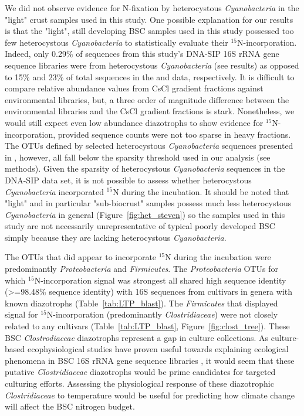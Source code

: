We did not observe evidence for N-fixation by heterocystous
\textit{Cyanobacteria} in the "light" crust samples used in this study. One
possible explanation for our results is that the "light", still developing
BSC samples used in this study possessed too few heterocystous
\textit{Cyanobacteria} to statistically evaluate their $^{15}$N-incorporation.
Indeed, only 0.29\% of sequences from this study's DNA-SIP 16S rRNA gene
sequence libraries were from heterocystous \textit{Cyanobacteria} (see results)
as opposed to 15\% and 23\% of total sequences in the \citet{Steven_2013} and
\citet{Garcia_Pichel_2013} data, respectively. It is difficult to compare
relative abundance values from CsCl gradient fractions against environmental
libraries, but, a three order of magnitude difference between the
environmental libraries and the CsCl gradient fractions is stark.
Nonetheless, we would still expect even low abundance diazotrophs to show
evidence for $^{15}$N-incorporation, provided sequence counts were not too
sparse in heavy fractions. The OTUs defined by selected heterocystous
\textit{Cyanobacteria} sequences presented in \citet{Yeager}, however, all
fall below the sparsity threshold used in our analysis (see methods). Given the
sparsity of heterocystous \textit{Cyanobacteria} sequences in the DNA-SIP data
set, it is not possible
to assess whether heterocystous \textit{Cyanobacteria} incorporated $^{15}$N
during the incubation. It should be noted that "light" and in particular
"sub-biocrust" samples possess much less heterocystous \textit{Cyanobacteria}
in general (Figure~\ref{fig:het_steven}) so the samples used in this study are
not necessarily unrepresentative of typical poorly developed BSC simply because
they are lacking heterocystous \textit{Cyanobacteria}. 

The OTUs that did appear to incorporate $^{15}$N during the incubation were
predominantly \textit{Proteobacteria} and \textit{Firmicutes}. The
\textit{Proteobacteria} OTUs for which $^{15}$N-incorporation signal was
strongest all shared high sequence identity (\textgreater=98.48\% sequence
identity) with 16S sequences from cultivars in genera with known diazotrophs
(Table~\ref{tab:LTP_blast}). The \textit{Firmicutes} that displayed signal
for $^{15}$N-incorporation (predominantly \textit{Clostridiaceae}) were not
closely related to any cultivars (Table~\ref{tab:LTP_blast},
Figure~\ref{fig:clost_tree}). These BSC \textit{Clostrodiaceae} diazotrophs
represent a gap in culture collections. As culture-based ecophysiological
studies have proven useful towards explaining ecological phenomena in BSC 16S
rRNA gene sequence libraries \citep{Garcia_Pichel_2013}, it would seem that
these putative \textit{Clostridiaceae} diazotrophs would be prime candidates
for targeted culturing efforts. Assessing the physiological response of these
diazotrophic \textit{Clostridiaceae} to temperature would be useful for
predicting how climate change will affect the BSC nitrogen budget. 

